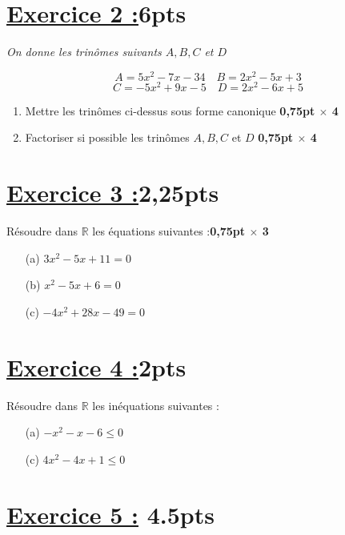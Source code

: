 \documentclass[12pt,a4paper]{article}
\begin{document}
\section*{\underline{Exercice 2 :}6pts}

\textit{On donne les trinômes suivants \( A, B, C \) et \( D \)}

\[
A = 5x^2 - 7x - 34 \quad B = 2x^2 - 5x + 3
\]
\[
C = -5x^2 + 9x - 5 \quad D = 2x^2 - 6x + 5
\]

\begin{enumerate}
    \item Mettre les trinômes ci-dessus sous forme canonique \textbf{0,75pt $\times$ 4}
    \item Factoriser si possible les trinômes \( A, B, C \) et \( D \) \textbf{0,75pt $\times$ 4}
\end{enumerate}

\bigskip

\section*{\underline{Exercice 3 :}2,25pts}

Résoudre dans \( \mathbb{R} \) les équations suivantes :\textbf{0,75pt $\times$ 3}

\begin{enumerate}
    \item[(a)] \( 3x^2 - 5x + 11 = 0 \) 
    \item[(b)] \( x^2 - 5x + 6 = 0 \) 
    \item[(c)] \( -4x^2 + 28x - 49 = 0 \) 
\end{enumerate}

\bigskip

\section*{\underline{Exercice 4 :}2pts}

Résoudre dans \( \mathbb{R} \) les inéquations suivantes :

\begin{enumerate}
    \item[(a)] \( -x^2 - x - 6 \leq 0 \) 
    \item[(c)] \( 4x^2 - 4x + 1 \leq 0 \) 
\end{enumerate}


\section*{\underline{Exercice 5 :} 4.5pts}
\end{document}
